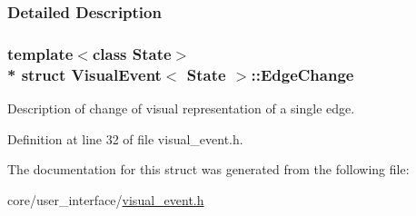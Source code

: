 \subsubsection{Detailed Description}
\subsubsection*{template$<$class State$>$\\*
struct Visual\+Event$<$ State $>$\+::\+Edge\+Change}

Description of change of visual representation of a single edge. 

Definition at line 32 of file visual\+\_\+event.\+h.



The documentation for this struct was generated from the following file\+:\begin{DoxyCompactItemize}
\item 
core/user\+\_\+interface/\hyperlink{visual__event_8h}{visual\+\_\+event.\+h}\end{DoxyCompactItemize}

